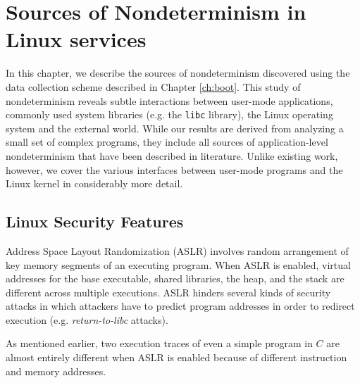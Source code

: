 \newenvironment{mylisting}
{\begin{list}{}{\setlength{\leftmargin}{1em}}\item\scriptsize\bfseries}
{\end{list}}

\chapter{Sources of Nondeterminism in Linux services} \label{ch:src}
In this chapter, we describe the sources of nondeterminism
discovered using the data collection scheme
described in Chapter \ref{ch:boot}.
This study of nondeterminism reveals
subtle interactions between user-mode
applications, commonly used system libraries (e.g. the \texttt{libc} library),
the Linux operating system and the external world.
While our results are derived from analyzing a small
set of complex programs, they include
all sources of application-level nondeterminism that 
have been described in literature. Unlike existing work,
however, we cover the various interfaces between user-mode programs
and the Linux kernel in considerably more detail.

\section{Linux Security Features} \label{ch3:security}
 \newline
Address Space Layout Randomization (ASLR) involves random arrangement of
key memory segments of an executing program. When ASLR is enabled,
virtual addresses for the base executable, shared libraries, 
the heap, and the stack are different across multiple executions.
ASLR hinders several kinds of security attacks in which attackers have to predict
program addresses in order to redirect execution (e.g. \emph{return-to-libc} attacks). 

\noindent As mentioned earlier, two execution traces of even a
simple program in $C$ are almost entirely different
when ASLR is enabled because of different
instruction and memory addresses. \newline

